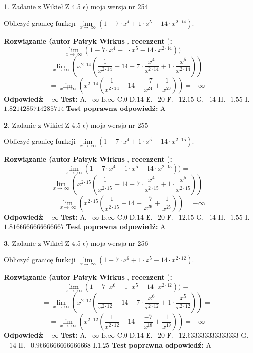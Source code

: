 \documentclass[12pt, a4paper]{article}
\theoremstyle{definition} %
\newtheorem{zad}{}
\newcommand{\zadStart}[1]{\begin{zad}#1\newline}
\newcommand{\zadStop}{\end{zad}}
\newcommand{\rozwStart}[2]{\noindent \textbf{Rozwiązanie (autor #1 , recenzent #2): }\newline}
\newcommand{\rozwStop}{\newline}
\newcommand{\odpStart}{\noindent \textbf{Odpowiedź:}\newline}
\newcommand{\odpStop}{\newline}
\newcommand{\testStart}{\noindent \textbf{Test:}\newline}
\newcommand{\testStop}{\newline}
\newcommand{\kluczStart}{\noindent \textbf{Test poprawna odpowiedź:}\newline}
\newcommand{\kluczStop}{\newline}
\begin{document}
\zadStart{Zadanie z Wikieł Z 4.5 e) moja wersja nr 254}


Obliczyć granicę funkcji  $\lim\limits_{x\to\ \infty}(1 - 7 \cdot x^{4}+1 \cdot x^{5}- 14 \cdot x^{2\cdot14})$.
\zadStop
\rozwStart{Patryk Wirkus}{}
$$\lim\limits_{x\to\ \infty}(1 - 7 \cdot x^{4}+1 \cdot x^{5}- 14 \cdot x^{2\cdot14}))=$$
$$=\lim\limits_{x\to\ \infty}(x^{2\cdot14}(\frac{1}{x^{2\cdot14}}-14 -7 \cdot \frac{x^{4}}{x^{2\cdot14}}+1 \cdot \frac{x^{5}}{x^{2\cdot14}}))=$$
$$=\lim\limits_{x\to\ \infty}(x^{2\cdot14}(\frac{1}{x^{2\cdot14}}-14 + \frac{-7}{x^{24}}+ \frac{1}{x^{23}}))=-\infty$$
\rozwStop
\odpStart
$-\infty$
\odpStop
\testStart
A.$-\infty$ B.$\infty$ C.$0$ D.$14$ E.$-20$
F.$-12.05$ G.$-14$
H.$-1.55$
I.$1.8214285714285714$
\testStop
\kluczStart
A
\kluczStop



\zadStart{Zadanie z Wikieł Z 4.5 e) moja wersja nr 255}


Obliczyć granicę funkcji  $\lim\limits_{x\to\ \infty}(1 - 7 \cdot x^{4}+1 \cdot x^{5}- 14 \cdot x^{2\cdot15})$.
\zadStop
\rozwStart{Patryk Wirkus}{}
$$\lim\limits_{x\to\ \infty}(1 - 7 \cdot x^{4}+1 \cdot x^{5}- 14 \cdot x^{2\cdot15}))=$$
$$=\lim\limits_{x\to\ \infty}(x^{2\cdot15}(\frac{1}{x^{2\cdot15}}-14 -7 \cdot \frac{x^{4}}{x^{2\cdot15}}+1 \cdot \frac{x^{5}}{x^{2\cdot15}}))=$$
$$=\lim\limits_{x\to\ \infty}(x^{2\cdot15}(\frac{1}{x^{2\cdot15}}-14 + \frac{-7}{x^{26}}+ \frac{1}{x^{25}}))=-\infty$$
\rozwStop
\odpStart
$-\infty$
\odpStop
\testStart
A.$-\infty$ B.$\infty$ C.$0$ D.$14$ E.$-20$
F.$-12.05$ G.$-14$
H.$-1.55$
I.$1.8166666666666667$
\testStop
\kluczStart
A
\kluczStop



\zadStart{Zadanie z Wikieł Z 4.5 e) moja wersja nr 256}


Obliczyć granicę funkcji  $\lim\limits_{x\to\ \infty}(1 - 7 \cdot x^{6}+1 \cdot x^{5}- 14 \cdot x^{2\cdot12})$.
\zadStop
\rozwStart{Patryk Wirkus}{}
$$\lim\limits_{x\to\ \infty}(1 - 7 \cdot x^{6}+1 \cdot x^{5}- 14 \cdot x^{2\cdot12}))=$$
$$=\lim\limits_{x\to\ \infty}(x^{2\cdot12}(\frac{1}{x^{2\cdot12}}-14 -7 \cdot \frac{x^{6}}{x^{2\cdot12}}+1 \cdot \frac{x^{5}}{x^{2\cdot12}}))=$$
$$=\lim\limits_{x\to\ \infty}(x^{2\cdot12}(\frac{1}{x^{2\cdot12}}-14 + \frac{-7}{x^{18}}+ \frac{1}{x^{19}}))=-\infty$$
\rozwStop
\odpStart
$-\infty$
\odpStop
\testStart
A.$-\infty$ B.$\infty$ C.$0$ D.$14$ E.$-20$
F.$-12.633333333333333$ G.$-14$
H.$-0.9666666666666668$
I.$1.25$
\testStop
\kluczStart
A
\kluczStop
\end{document}
